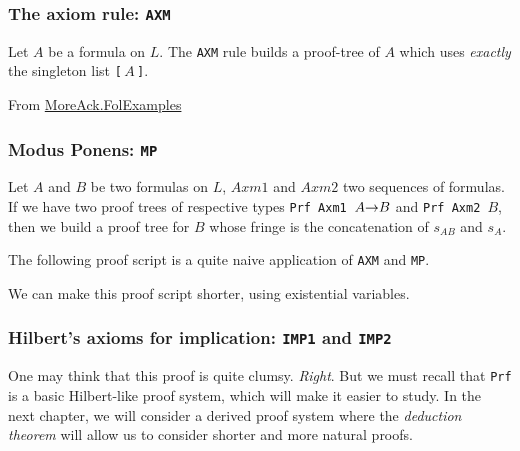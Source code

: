 \subsubsection{The axiom rule: \texttt{AXM}}

Let $A$ be a formula on $L$.  The \texttt{AXM} rule builds a proof-tree
of $A$ which uses \emph{exactly} the singleton list \texttt{[$\,A\,$]}.



\noindent From \href{../theories/html/hydras.MoreAck.FolExamples.html}{MoreAck.FolExamples}


\subsubsection{Modus Ponens: \texttt{MP}}

Let $A$ and $B$ be two formulas on $L$, $\textit{Axm1}$
 and $\textit{Axm2}$ two sequences of formulas.
If we have 
two proof trees of respective types \texttt{Prf Axm1 $A\mbox{$\rightarrow$} B$} and  \texttt{Prf Axm2 $B$}, then we build a proof tree
for $B$ whose fringe is the concatenation of $s_{AB}$ and $s_A$.



The following proof script is a quite naive application of 
\texttt{AXM} and \texttt{MP}.

\label{proof:PrfEx2}

We can make this proof script shorter, using existential variables.



\subsubsection{Hilbert's axioms for implication: \texttt{IMP1} and \texttt{IMP2}}


\label{proof:PrfEx3}

\begin{remark}
\label{sec:remark-on-hilbert-systems}
One may think that this proof 
is quite clumsy. \emph{Right}.
But we must recall that \texttt{Prf} is a basic Hilbert-like
proof system, which will make it easier to study.
In the next chapter, we will consider a derived proof system 
where the \emph{deduction theorem} will allow us to consider shorter and more natural proofs.
\end{remark}

